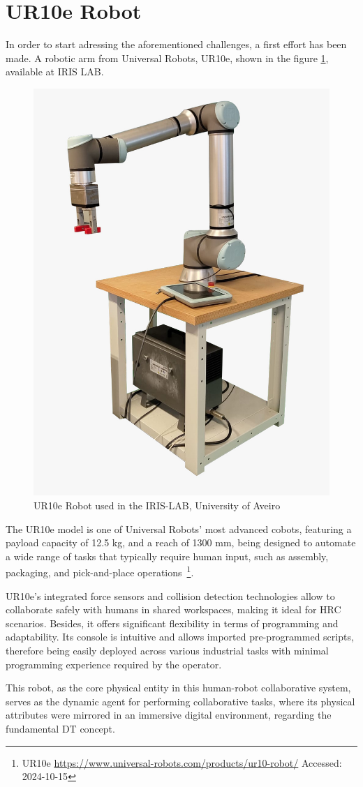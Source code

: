 \section{UR10e Robot}

In order to start adressing the aforementioned challenges, a first effort has been made. A robotic arm from Universal Robots, UR10e, shown in the figure \ref{f:ur10e_iris}, available at IRIS LAB.

\begin{figure}[h]
    \centering
    \includegraphics[width=0.4\linewidth]{figs/ur10e.jpeg}
    \caption{UR10e Robot used in the IRIS-LAB, University of Aveiro}
    \label{f:ur10e_iris}
\end{figure}

The UR10e model is one of Universal Robots' most advanced cobots, featuring a payload capacity of 12.5 kg, and a reach of 1300 mm, being designed to automate a wide range of tasks that typically require human input, such as assembly, packaging, and pick-and-place operations~\footnote{UR10e \url{https://www.universal-robots.com/products/ur10-robot/} Accessed: 2024-10-15}.

UR10e's integrated force sensors and collision detection technologies allow to collaborate safely with humans in shared workspaces, making it ideal for \ac{HRC} scenarios. Besides, it offers significant flexibility in terms of programming and adaptability. Its console is intuitive and allows imported pre-programmed scripts, therefore being easily deployed across various industrial tasks with minimal programming experience required by the operator.

This robot, as the core physical entity in this human-robot collaborative system, serves as the dynamic agent for performing collaborative tasks, where its physical attributes were mirrored in an immersive digital environment, regarding the fundamental \ac{DT} concept.

